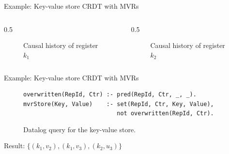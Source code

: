 \documentclass[USenglish,aspectratio=169]{beamer} %
\newcommand{\setop}[5][set]{$\mathit{#1}_{#2}^{#3} (#4, #5)$}
\begin{document}
\begin{frame}{Example: Key-value store \acs{CRDT} with \aclp{MVR}}
    \small
    \def\dist{15pt}
    \begin{columns}
        \begin{column}{0.5\textwidth}
            \begin{figure}
                \centering
                \caption{Causal history of register \(k_1\)}\label{fig:causal-history-k1}
            \end{figure}
        \end{column}
        \begin{column}{0.5\textwidth}
            \begin{figure}
                \centering
                \caption{Causal history of register \(k_2\)}\label{fig:causal-history-k2}
            \end{figure}
        \end{column}
    \end{columns}
\end{frame}

\begin{frame}[fragile]{Example: Key-value store \acs{CRDT} with \aclp{MVR}}
    \begin{figure}
        \centering
        \begin{lstlisting}[keepspaces]
overwritten(RepId, Ctr) :- pred(RepId, Ctr, _, _).
mvrStore(Key, Value)    :- set(RepId, Ctr, Key, Value),
                           not overwritten(RepId, Ctr).\end{lstlisting}
        \caption{Datalog query for the key-value store.}\label{code:mvr-store-datalog}
    \end{figure}

    Result: \(\{ (k_1, v_2), (k_1, v_3), (k_2, u_3) \}\)
\end{frame}
\end{document}
